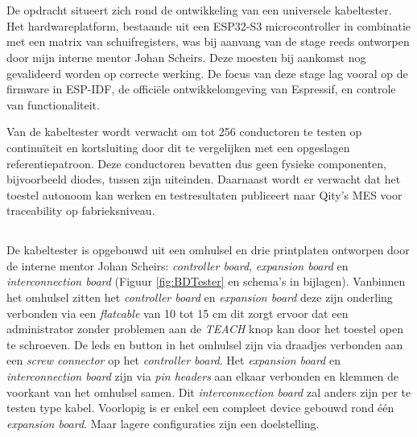 
\chapter{}%
\label{ch:methodologie}

\section{}%
\label{sec:Situering}

De opdracht situeert zich rond de ontwikkeling van een universele kabeltester. Het hardwareplatform, bestaande uit een ESP32-S3 microcontroller in combinatie met een matrix van schuifregisters, was bij aanvang van de stage reeds ontworpen door mijn interne mentor Johan Scheirs. Deze moesten bij aankomst nog gevalideerd worden op correcte werking. De focus van deze stage lag vooral op de firmware in \gls{ESP-IDF}, de officiële ontwikkelomgeving van Espressif, en controle van functionaliteit.

Van de kabeltester wordt verwacht om tot 256 conductoren te testen op continuïteit en kortsluiting door dit te vergelijken met een opgeslagen referentiepatroon. Deze conductoren bevatten dus geen fysieke componenten, bijvoorbeeld diodes, tussen zijn uiteinden. Daarnaast wordt er verwacht dat het toestel autonoom kan werken en testresultaten publiceert naar Qity's \gls{MES} voor traceability op fabrieksniveau.


\section{}%
\label{sec:PCB}

De kabeltester is opgebouwd uit een omhulsel en drie printplaten ontworpen door de interne mentor Johan Scheirs: \textit{controller board}, \textit{expansion board} en \textit{interconnection board} (Figuur \ref{fig:BDTester} en schema's in bijlagen). Vanbinnen het omhulsel zitten het \textit{controller board} en \textit{expansion board} deze zijn onderling verbonden via een \textit{flatcable} van 10 tot 15 cm dit zorgt ervoor dat een administrator zonder problemen aan de \textit{TEACH} knop kan door het toestel open te schroeven. De leds en button in het omhulsel zijn via draadjes verbonden aan een \textit{screw connector} op het \textit{controller board}. Het \textit{expansion board} en \textit{interconnection board} zijn via \textit{pin headers} aan elkaar verbonden en klemmen de voorkant van het omhulsel samen. Dit \textit{interconnection board} zal anders zijn per te testen type kabel. Voorlopig is er enkel een compleet device gebouwd rond één \textit{expansion board}. Maar lagere configuraties zijn een doelstelling.


